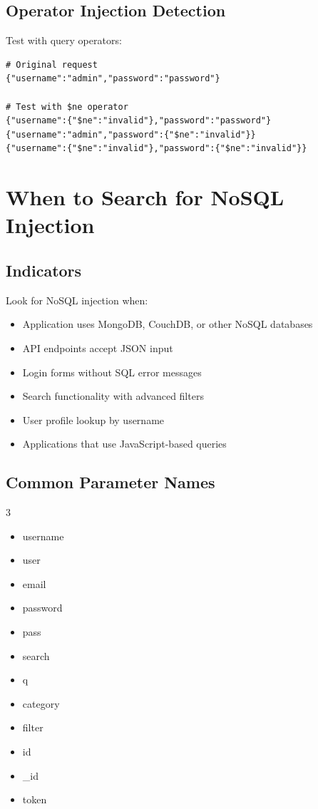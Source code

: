 \documentclass[12pt]{article}
\begin{document}
\subsection{Operator Injection Detection}

Test with query operators:

\begin{lstlisting}
# Original request
{"username":"admin","password":"password"}

# Test with $ne operator
{"username":{"$ne":"invalid"},"password":"password"}
{"username":"admin","password":{"$ne":"invalid"}}
{"username":{"$ne":"invalid"},"password":{"$ne":"invalid"}}
\end{lstlisting}

\section{When to Search for NoSQL Injection}

\subsection{Indicators}

Look for NoSQL injection when:

\begin{itemize}
    \item Application uses MongoDB, CouchDB, or other NoSQL databases
    \item API endpoints accept JSON input
    \item Login forms without SQL error messages
    \item Search functionality with advanced filters
    \item User profile lookup by username
    \item Applications that use JavaScript-based queries
\end{itemize}

\subsection{Common Parameter Names}

\begin{multicols}{3}
\begin{itemize}
    \item username
    \item user
    \item email
    \item password
    \item pass
    \item search
    \item q
    \item category
    \item filter
    \item id
    \item \_id
    \item token
\end{itemize}
\end{multicols}
\end{document}
